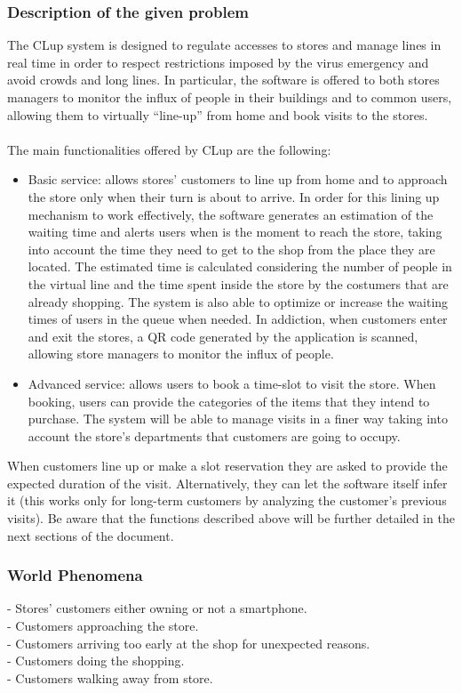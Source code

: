 \documentclass{article}
\begin{document}
\subsubsection{Description of the given problem}
The CLup system is designed to regulate accesses to stores and manage lines in real time in order to respect restrictions imposed by the virus emergency and avoid crowds and long lines. In particular, the software is offered to both stores managers to monitor the influx of people in their buildings and to common users, allowing them to virtually “line-up” from home and book visits to the stores.\\
\smallskip\\
The main functionalities offered by CLup are the following:\\
\begin{itemize}
\item Basic service: allows stores' customers to line up from home and to approach the store only when their turn is about to arrive. In order for this lining up mechanism to work effectively, the software generates an estimation of the waiting time and alerts users when is the moment to reach the store, taking into account the time they need to get to the shop from the place they are located. The estimated time is calculated considering the number of people in the virtual line and the time spent inside the store by the costumers that are already shopping. The system is also able to optimize or increase the waiting times of users in the queue when needed. In addiction, when customers enter and exit the stores, a QR code generated by the application is scanned, allowing store managers to monitor the influx of people.
\item Advanced service: allows users to book a time-slot to visit the store. When booking, users can provide the categories of the items that they intend to purchase. The system will be able to manage visits in a finer way taking into account the store's departments that customers are going to occupy.
\end{itemize}
When customers line up or make a slot reservation they are asked to provide the expected duration of the visit. Alternatively, they can let the software itself infer it (this works only for long-term customers by analyzing the customer’s previous visits).
Be aware that the functions described above will be further detailed in the next sections of the document.
\subsubsection{World Phenomena}
\noindent\medskip
[WP1] - Stores’ customers either owning or not a smartphone.\\
\noindent\medskip
[WP2] - Customers approaching the store.\\
\noindent\medskip
[WP3] - Customers arriving too early at the shop for unexpected reasons.\\
\noindent\medskip
[WP4] - Customers doing the shopping.\\
\noindent\medskip
[WP5] - Customers walking away from store.
\end{document}
